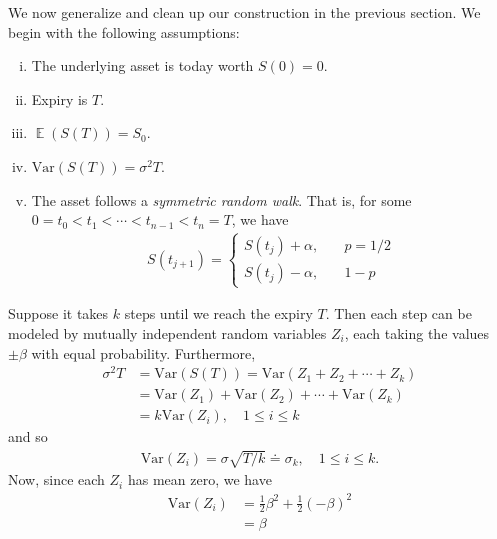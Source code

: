 \documentclass[12pt]{article}
\DeclareMathOperator{\ex}{\mathbb{E}}
\newcommand{\var}{\mathrm{Var}}
\theoremstyle{plain}
\theoremstyle{definition}
\theoremstyle{remark}
\numberwithin{equation}{section}  %
\begin{document}
We now generalize and clean up our construction in the previous section.
We begin with the following assumptions: 
\begin{enumerate}[(i)]
	\item The underlying asset is today worth $S(0) = 0$.
	\item Expiry is $T$.
	\item $\ex(S(T)) = S_{0}$.
	\item $\var(S(T)) = \sigma^{2} T$.
	\item The asset follows a \emph{symmetric random walk}. That is,
		for some \\ $0=t_{0} < t_{1} < \cdots < t_{n-1} < t_{n} = T$, we have
		\begin{equation*}
			\begin{split}
				S(t_{j+1})  = \begin{cases}
					S(t_{j}) + \alpha, \quad & p = 1/2 \\
					S(t_{j}) - \alpha, \quad & 1-p
				\end{cases}
			\end{split}
		\end{equation*}
\end{enumerate}
Suppose it takes $k$ steps until we reach the expiry $T$. Then
each step can be modeled by mutually independent random variables
$Z_{i}$, each taking the values $\pm \beta$ with equal probability.
Furthermore, 
\begin{equation*}
	\begin{split}
		\sigma^{2} T
		& = \var(S(T)) = \var(Z_{1} + Z_{2} + \cdots + Z_{k})
		\\
		& = \var(Z_{1}) + \var(Z_{2}) + \cdots + \var(Z_{k})
		\\
		& = k \var(Z_{i}), \quad 1 \le i \le k
	\end{split}
\end{equation*}
and so
\begin{equation*}
	\begin{split}
		\var(Z_{i}) = \sigma \sqrt{T/k} \doteq \sigma_{k}, \quad 1 \le i \le k.
	\end{split}
\end{equation*}
Now, since each $Z_{i}$ has mean zero, we have
\begin{equation*}
	\begin{split}
		\var(Z_{i}) & = \frac{1}{2}\beta^{2} + \frac{1}{2}{(-\beta)}^{2}
		\\
		& = \beta
	\end{split}
\end{equation*}
\end{document}
